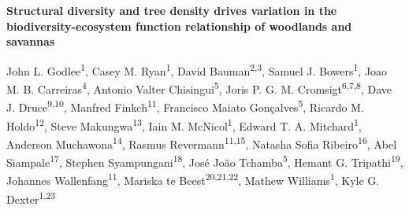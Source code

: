 \documentclass[11pt,a4paper]{article}
\begin{document}
{\textbf{Structural diversity and tree density drives variation in the biodiversity-ecosystem function relationship of woodlands and savannas}}

\vspace{1cm}

John L. Godlee\textsuperscript{1}, Casey M. Ryan\textsuperscript{1}, David Bauman\textsuperscript{2,3}, Samuel J. Bowers\textsuperscript{1}, Joao M. B. Carreiras\textsuperscript{4}, Antonio Valter Chisingui\textsuperscript{5}, Joris P. G. M. Cromsigt\textsuperscript{6,7,8}, Dave J. Druce\textsuperscript{9,10}, Manfred Finkch\textsuperscript{11}, Francisco Maiato Gon\c{c}alves\textsuperscript{5}, Ricardo M. Holdo\textsuperscript{12}, Steve Makungwa\textsuperscript{13}, Iain M. McNicol\textsuperscript{1}, Edward T. A. Mitchard\textsuperscript{1}, Anderson Muchawona\textsuperscript{14}, Rasmus Revermann\textsuperscript{11,15}, Natasha Sofia Ribeiro\textsuperscript{16}, Abel Siampale\textsuperscript{17}, Stephen Syampungani\textsuperscript{18}, Jos\'{e} Jo\~{a}o Tchamba\textsuperscript{5}, Hemant G. Tripathi\textsuperscript{19}, Johannes Wallenfang\textsuperscript{11}, Mariska te Beest\textsuperscript{20,21,22}, Mathew Williams\textsuperscript{1}, Kyle G. Dexter\textsuperscript{1,23}
\end{document}
